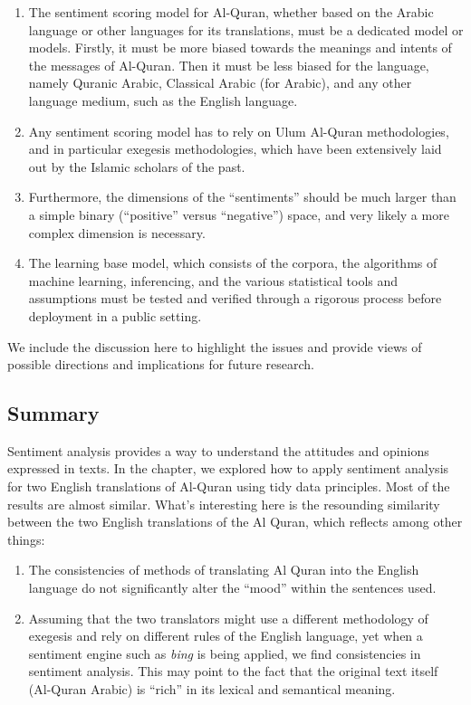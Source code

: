 \documentclass[
]{article}
\providecommand{\tightlist}{%
  \setlength{\itemsep}{0pt}\setlength{\parskip}{0pt}}
\begin{document}
\begin{enumerate}
\def\labelenumi{\arabic{enumi}.}
\tightlist
\item
  The sentiment scoring model for Al-Quran, whether based on the Arabic language or other languages for its translations, must be a dedicated model or models. Firstly, it must be more biased towards the meanings and intents of the messages of Al-Quran. Then it must be less biased for the language, namely Quranic Arabic, Classical Arabic (for Arabic), and any other language medium, such as the English language.
\item
  Any sentiment scoring model has to rely on Ulum Al-Quran methodologies, and in particular exegesis methodologies, which have been extensively laid out by the Islamic scholars of the past.
\item
  Furthermore, the dimensions of the ``sentiments'' should be much larger than a simple binary (``positive'' versus ``negative'') space, and very likely a more complex dimension is necessary.
\item
  The learning base model, which consists of the corpora, the algorithms of machine learning, inferencing, and the various statistical tools and assumptions must be tested and verified through a rigorous process before deployment in a public setting.
\end{enumerate}

We include the discussion here to highlight the issues and provide views of possible directions and implications for future research.

\hypertarget{summary-chapter-3}{%
\subsection{Summary}\label{summary-chapter-3}}

Sentiment analysis provides a way to understand the attitudes and opinions expressed in texts. In the chapter, we explored how to apply sentiment analysis for two English translations of Al-Quran using tidy data principles. Most of the results are almost similar. What's interesting here is the resounding similarity between the two English translations of the Al Quran, which reflects among other things:

\begin{enumerate}
\def\labelenumi{\arabic{enumi}.}
\tightlist
\item
  The consistencies of methods of translating Al Quran into the English language do not significantly alter the ``mood'' within the sentences used.
\item
  Assuming that the two translators might use a different methodology of exegesis and rely on different rules of the English language, yet when a sentiment engine such as \emph{bing} is being applied, we find consistencies in sentiment analysis. This may point to the fact that the original text itself (Al-Quran Arabic) is ``rich'' in its lexical and semantical meaning.
\end{enumerate}
\end{document}
